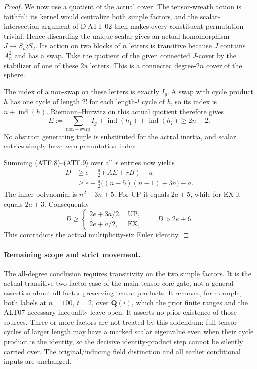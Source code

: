 \begin{proof}
We now use a quotient of the actual cover. The tensor-wreath
action is faithful: its kernel would centralize both simple
factors, and the scalar-intersection argument of D-ATT-02
then makes every constituent permutation trivial. Hence
discarding the unique scalar gives an actual homomorphism
$J\longrightarrow S_n\wr S_2$. Its action on two blocks
of $n$ letters is transitive because $J$ contains $A_n^2$
and has a swap. Take the quotient of the given connected
$J$-cover by the stabilizer of one of these $2n$ letters.
This is a connected degree-$2n$ cover of the sphere.

The index of a non-swap on these letters is exactly $I_g$.
A swap with cycle product $h$ has one cycle of length $2l$
for each length-$l$ cycle of $h$, so its index is
$n+\operatorname{ind}(h)$. Riemann--Hurwitz on this actual
quotient therefore gives
\[
 E:=\sum_{\mathrm{non\!\!-\!swap}} I_g
          +\operatorname{ind}(h_1)+\operatorname{ind}(h_2)
                          \ge2n-2.                        \tag{ATF.10}
\]
No abstract generating tuple is substituted for the actual
inertia, and scalar entries simply have zero permutation index.

Summing (ATF.8)--(ATF.9) over all $r$ entries now yields
\[
 \begin{split}
 D&\ge e+\frac a2(AE+rB)-a\\
  &\ge e+\frac a2\big((n-5)(n-1)+3n\big)-a.
 \end{split}                                               \tag{ATF.11}
\]
The inner polynomial is $n^2-3n+5$. For UP it equals
$2a+5$, while for EX it equals $2a+3$. Consequently
\[
 D\ge\begin{cases}2e+3a/2,&\mathrm{UP},\\
                   2e+a/2,&\mathrm{EX},\end{cases}
                            \qquad D>2e+6.                 \tag{ATF.12}
\]
This contradicts the actual multiplicity-six Euler identity.
\end{proof}

\paragraph{Remaining scope and strict movement.}
The all-degree conclusion requires transitivity on the two
simple factors. It is the actual transitive two-factor case
of the main tensor-core gate, not a general assertion about
all factor-preserving tensor products. It removes, for example,
both labels at $n=100$, $t=2$, over $\mathbf Q(i)$, which
the prior finite ranges and the ALT07 necessary inequality
leave open. It asserts no prior existence of those sources.
Three or more factors are not treated by this addendum:
full tensor cycles of larger length may have a marked scalar
eigenvalue even when their cycle product is the identity,
so the decisive identity-product step cannot be silently
carried over. The original/inducing field distinction and
all earlier conditional inputs are unchanged.
